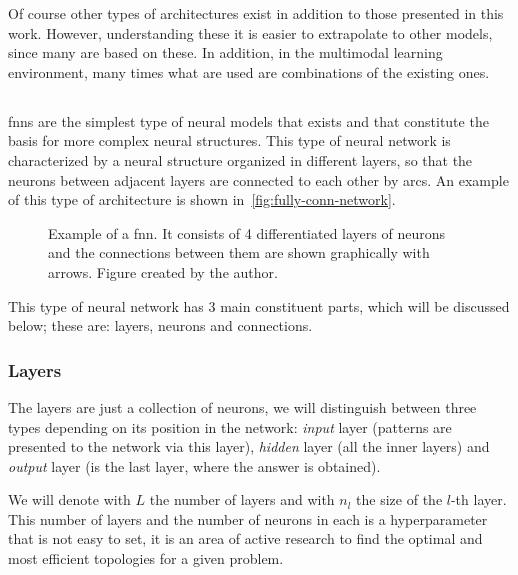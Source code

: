 Of course other types of architectures exist in addition to those presented in
this work. However, understanding these it is easier to extrapolate to other
models, since many are based on these. In addition, in the multimodal
learning environment, many times what are used are
combinations of the existing ones.


\subsection{}\label{sec:fnn}

\Glspl{fnn} are the simplest type of neural models that exists and that
constitute the basis for more complex neural structures. This type of neural
network is characterized by a neural structure organized in different layers,
so that the neurons between adjacent layers are connected to each other by
arcs. An example of this type of architecture is shown in\
\vref{fig:fully-conn-network}.

\begin{figure}[ht]
  \centering
  
  \caption[ topology]{Example of a \acl{fnn}. It consists of
    4 differentiated layers of neurons and the connections between them are
    shown graphically with arrows. Figure created by the author.}%
  \label{fig:fully-conn-network}
\end{figure}

This type of neural network has 3 main constituent parts, which will be
discussed below; these are: layers, neurons and connections.

\subsubsection{Layers}

The layers are just a collection of neurons, we will distinguish between three
types depending on its position in the network: \emph{input} layer (patterns
are presented to the network via this layer), \emph{hidden} layer (all the
inner layers) and \emph{output} layer (is the last layer, where the answer is
obtained).

We will denote with \(L\) the number of layers and with \(n_l\) the size of the
\(l\)-th layer. This number of layers and the number of neurons in each is a
hyperparameter that is not easy to set, it is an area of active research to
find the optimal and most efficient topologies for a given problem.

